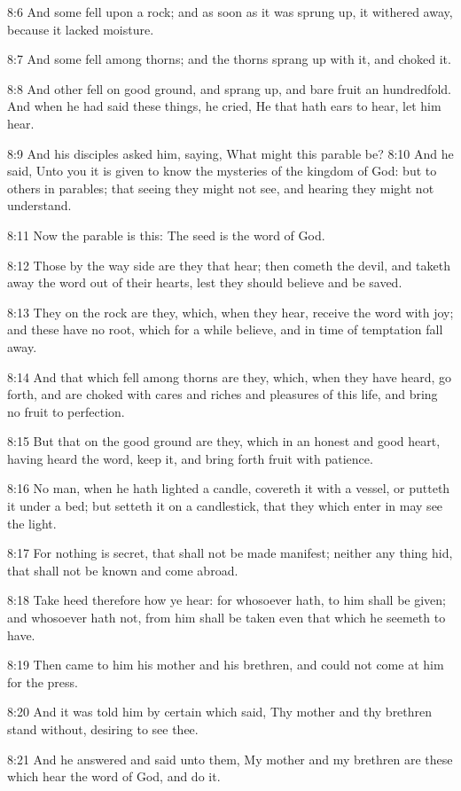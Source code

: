8:6 And some fell upon a rock; and as soon as it was sprung up, it withered away, because it lacked moisture.

8:7 And some fell among thorns; and the thorns sprang up with it, and choked it.

8:8 And other fell on good ground, and sprang up, and bare fruit an hundredfold. And when he had said these things, he cried, He that hath ears to hear, let him hear.

8:9 And his disciples asked him, saying, What might this parable be?  8:10 And he said, Unto you it is given to know the mysteries of the kingdom of God: but to others in parables; that seeing they might not see, and hearing they might not understand.

8:11 Now the parable is this: The seed is the word of God.

8:12 Those by the way side are they that hear; then cometh the devil, and taketh away the word out of their hearts, lest they should believe and be saved.

8:13 They on the rock are they, which, when they hear, receive the word with joy; and these have no root, which for a while believe, and in time of temptation fall away.

8:14 And that which fell among thorns are they, which, when they have heard, go forth, and are choked with cares and riches and pleasures of this life, and bring no fruit to perfection.

8:15 But that on the good ground are they, which in an honest and good heart, having heard the word, keep it, and bring forth fruit with patience.

8:16 No man, when he hath lighted a candle, covereth it with a vessel, or putteth it under a bed; but setteth it on a candlestick, that they which enter in may see the light.

8:17 For nothing is secret, that shall not be made manifest; neither any thing hid, that shall not be known and come abroad.

8:18 Take heed therefore how ye hear: for whosoever hath, to him shall be given; and whosoever hath not, from him shall be taken even that which he seemeth to have.

8:19 Then came to him his mother and his brethren, and could not come at him for the press.

8:20 And it was told him by certain which said, Thy mother and thy brethren stand without, desiring to see thee.

8:21 And he answered and said unto them, My mother and my brethren are these which hear the word of God, and do it.

